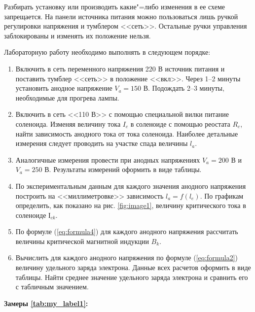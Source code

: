 Разбирать установку или производить какие"=либо изменения в ее схеме запрещается. На панели источника питания можно пользоваться лишь ручкой регулировки напряжения и тумблером <<сеть>>. Остальные ручки управления заблокированы и изменять их положение нельзя.

Лабораторную работу необходимо выполнять в следующем порядке:
\begin{enumerate}
    \item{ Включить в сеть переменного напряжения 220 В источник питания и поставить тумблер <<сеть>> в положение <<вкл>>. Через 1--2 минуты установить анодное напряжение $V_a = 150$ В. Подождать 2--3 минуты, необходимые для прогрева лампы. }
    \item{ Включить в сеть <<110 В>> с помощью специальной вилки питание соленоида. Изменяя величину тока $I_c$ в соленоиде с помощью реостата $R_c$, найти зависимость анодного тока от тока соленоида. Наиболее детальные измерения следует проводить на участке спада величины $l_a$. }
    \item{ Аналогичные измерения провести при анодных напряжениях $V_a = 200$ В и $V_a = 250$ В. Результаты измерений оформить в виде таблицы. }
    \item{ По экспериментальным данным для каждого значения анодного напряжения построить на <<миллиметровке>> зависимость $l_a = f(l_e)$. По графикам определить, как показано на рис. \ref{fig:image1}, величину критического тока в соленоиде $І_{ck}$. }
    \item{ По формуле (\ref{eq:formula4}) для каждого анодного напряжения рассчитать величины критической магнитной индукции $B_k$. }
    \item{ Вычислить для каждого анодного напряжения по формуле (\ref{eq:formula2}) величину удельного заряда электрона. Данные всех расчетов оформить в виде таблицы. Найти среднее значение удельного заряда электрона и сравнить его с табличным значением. }
\end{enumerate}

\vspace{1cm}

\textbf{Замеры \ref{tab:my_label1}:}

